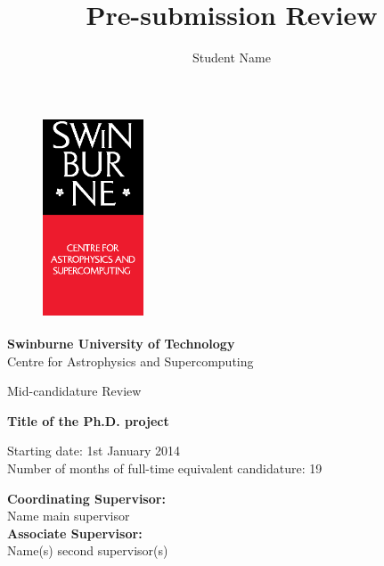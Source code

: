 \documentclass[useAMS,usenatbib,onecolumn]{mnras}
\title{Pre-submission Review}
\author[Student Name]
 {Student Name}
\begin{document}
\fontsize{11}{12.5}\selectfont
\begin{center}

\begin{figure}
\begin{center}
\includegraphics[height=6cm,width=3cm]{./astro_v.eps}
\end{center}
\end{figure}

{\bf \LARGE S\Large winburne \LARGE U\Large niversity of  \LARGE T\Large echnology\\
\vspace{0.5cm}}
\LARGE C\Large entre for \LARGE A\Large strophysics and \LARGE S\Large upercomputing\\
\vspace{0.5cm}

\large Mid-candidature Review\\
\vspace{0.5cm}



\Huge{\bf Title of the Ph.D. project}

\vspace{3cm}
\large{Starting date: 1st January 2014\\}
\vspace{0.2cm}
\large{Number of months of full-time equivalent candidature: 19}
\vspace{0.5cm}
\end{center}


\begin{flushleft}
{\bf Coordinating Supervisor:}\\
Name main supervisor\\
\vspace{0.5cm}
{\bf Associate Supervisor:}\\
Name(s) second supervisor(s)\\
\end{flushleft}
\end{document}
